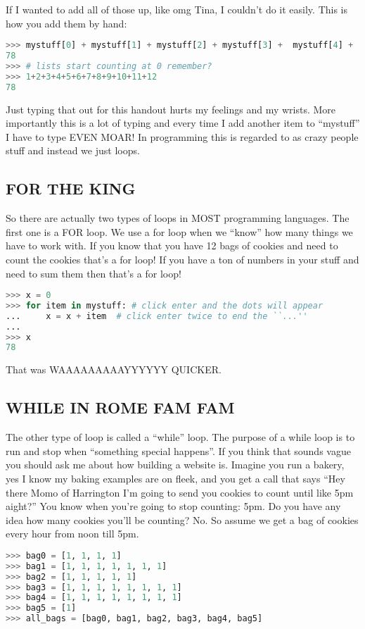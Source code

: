 \documentclass{article}
\begin{document}
If I wanted to add all of those up, like omg Tina, I couldn't do it easily. 
This is how you add them by hand:
\begin{lstlisting}[language=Python]
>>> mystuff[0] + mystuff[1] + mystuff[2] + mystuff[3] +  mystuff[4] +  mystuff[5] +  mystuff[6] +  mystuff[7] +  mystuff[8] +  mystuff[9] +  mystuff[10] +  mystuff[11] 
78
>>> # lists start counting at 0 remember?
>>> 1+2+3+4+5+6+7+8+9+10+11+12
78
\end{lstlisting}
Just typing that out for this handout hurts my feelings and my wrists. 
More importantly this is a lot of typing and every time I add another item to ``mystuff'' I 
have to type EVEN MOAR!
In programming this is regarded to as crazy people stuff and instead we just loops. 

\subsection{FOR THE KING}
So there are actually two types of loops in MOST programming languages. 
The first one is a FOR loop. 
We use a for loop when we ``know'' how many things we have to work with. 
If you know that you have 12 bags of cookies and need to count the cookies that's a for loop!
If you have a ton of numbers in your stuff and need to sum them then that's a for loop!
\begin{lstlisting}[language=Python]
>>> x = 0
>>> for item in mystuff: # click enter and the dots will appear
...     x = x + item  # click enter twice to end the ``...''
... 
>>> x
78
\end{lstlisting}
That was WAAAAAAAAAYYYYYY QUICKER. 

\subsection{WHILE IN ROME FAM FAM}

The other type of loop is called a ``while'' loop. 
The purpose of a while loop is to run and stop when ``something special happens''. 
If you think that sounds vague you should ask me about how building a website is.
Imagine you run a bakery, yes I know my baking examples are on fleek, and you get a call that says 
``Hey there Momo of Harrington I'm going to send you cookies to count until like 5pm aight?''
You know when you're going to stop counting: 5pm. 
Do you have any idea how many cookies you'll be counting? 
No.
So assume we get a bag of cookies every hour from noon till 5pm.
\begin{lstlisting}[language=Python]
>>> bag0 = [1, 1, 1, 1]
>>> bag1 = [1, 1, 1, 1, 1, 1, 1]
>>> bag2 = [1, 1, 1, 1, 1]
>>> bag3 = [1, 1, 1, 1, 1, 1, 1, 1]
>>> bag4 = [1, 1, 1, 1, 1, 1, 1, 1]
>>> bag5 = [1]
>>> all_bags = [bag0, bag1, bag2, bag3, bag4, bag5]
\end{lstlisting}
\end{document}
